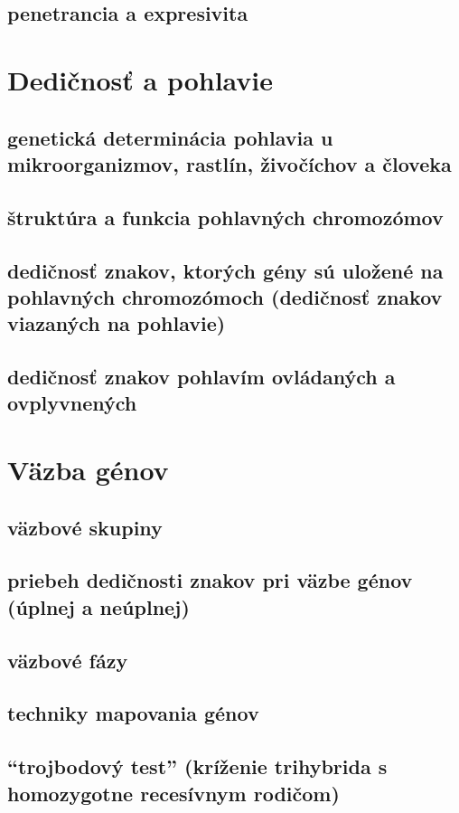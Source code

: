 \subsection{penetrancia a expresivita}

\section{Dedičnosť a pohlavie}
\subsection{genetická determinácia pohlavia u mikroorganizmov, rastlín, živočíchov a človeka}
\subsection{štruktúra a funkcia pohlavných chromozómov}
\subsection{dedičnosť znakov, ktorých gény sú uložené na pohlavných chromozómoch (dedičnosť znakov viazaných na pohlavie)}
\subsection{dedičnosť znakov pohlavím ovládaných a ovplyvnených}

\section{Väzba génov}
\subsection{väzbové skupiny}
\subsection{priebeh dedičnosti znakov pri väzbe génov (úplnej a neúplnej)}
\subsection{väzbové fázy}
\subsection{techniky mapovania génov}
\subsection{“trojbodový test” (kríženie trihybrida s homozygotne recesívnym rodičom)}
